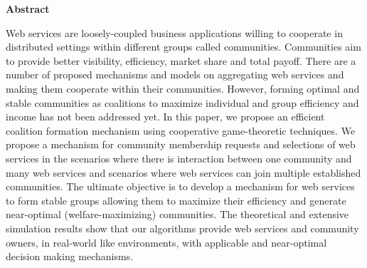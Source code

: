 \begin{center}
{\LARGE\textbf{Abstract}}
\end{center}

Web services are loosely-coupled business applications willing to
cooperate in distributed settings within different groups called
communities. Communities aim to provide better visibility,
efficiency, market share and total payoff. There are a number of
proposed mechanisms and models on aggregating web services and
making them cooperate within their communities. However, forming
optimal and stable communities as coalitions to maximize
individual and group efficiency and income has not been addressed
yet. In this paper, we propose an efficient coalition formation
mechanism using cooperative game-theoretic techniques. We propose
a mechanism for community membership requests and selections of
web services in the scenarios where there is interaction between one community and many web services
and scenarios where web services can join multiple established communities. The ultimate objective is to
develop a mechanism for web services to form stable groups
allowing them to maximize their efficiency and generate
near-optimal (welfare-maximizing) communities. The theoretical and
extensive simulation results show that our algorithms provide web services
and community owners, in real-world like environments, with applicable and near-optimal decision
making mechanisms.






















